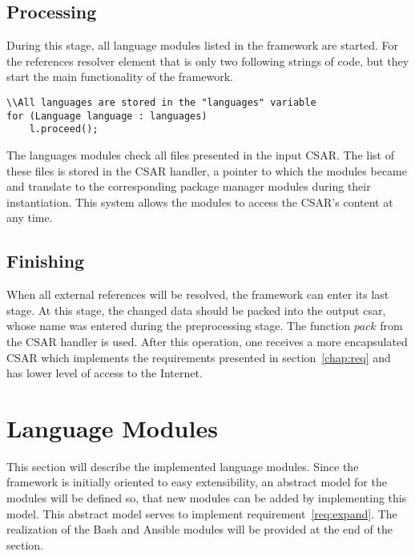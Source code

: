 \subsection*{Processing}
During this stage, all language modules listed in the framework are started.
For the references resolver element that is only two following strings of code, but they start the main functionality of the framework.
\begin{lstlisting}
\\All languages are stored in the "languages" variable
for (Language language : languages)
	l.proceed();
\end{lstlisting}
The languages modules check all files presented in the input CSAR. 
The list of these files is stored in the CSAR handler, a pointer to which the modules became and translate to the corresponding package manager modules during their instantiation.
This system allows the modules to access the CSAR's content at any time.


\subsection*{Finishing}
When all external references will be resolved, the framework can enter its last stage.
At this stage, the changed data should be packed into the output \gls{csar}, whose name was entered during the preprocessing stage.
The function $pack$ from the CSAR handler is used. 
After this operation, one receives a more encapsulated CSAR which implements the requirements presented in section~\ref{chap:req} and has lower level of access to the Internet.

\section{Language Modules} 
This section will describe the implemented language modules. %
Since the framework is initially oriented to easy extensibility, an abstract model for the modules will be defined so, that new modules can be added by implementing this model.
This abstract model serves to implement requirement~\ref{req:expand}.
The realization of the Bash and Ansible modules will be provided at the end of the section. %


